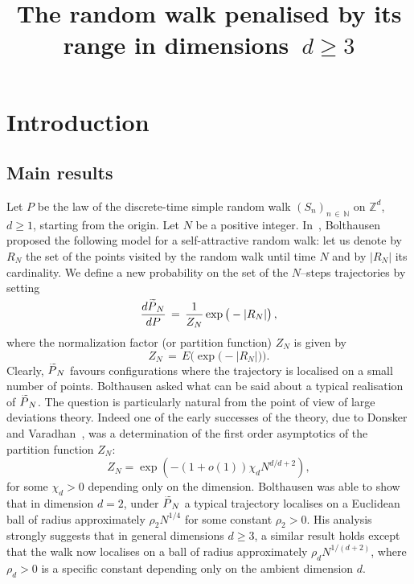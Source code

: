 \documentclass[AHL, Unicode, longabstracts, published]{cedram}
\title[The random walk penalised by its range]{The random walk penalised by its range in dimensions~$d\geq 3$}
\author[\initial{N.} \lastname{Berestycki}]{\firstname{Nathana\"el} \lastname{Berestycki}}
\author[\initial{R.} \lastname{Cerf}]{\firstname{Rapha\"el} \lastname{Cerf}}
\newcommand*\N {{\mathbb N}}
\newcommand*\wP{\smash{\widetilde P}}
\renewcommand{\N}{\mathbb{N}}
\begin{document}
\maketitle


\pagebreak
\tableofcontents
\pagebreak
\section{Introduction}

\subsection{Main results}

Let $P$ be the law of the discrete-time simple random walk $(S_n)_{n\,\in\,\N}$ on $\mathbb{Z}^d$, $d\geq 1$, starting from the origin. Let $N$ be a positive integer. In~\cite{BO}, Bolthausen proposed the following model for a self-attractive random walk: let us denote by $R_N$ the set of the points visited by the random walk until time $N$ and by $|R_N|$ its cardinality. We define a new probability on the set of the $N$--steps trajectories by setting
\begin{equation}\label{defPN}
\frac{d\wP_N}{dP}\,=\,\frac{1}{Z_N}\exp\big(-|R_N|\big)\,,
\end{equation}
where the normalization factor (or partition function) $Z_N$ is given by
\begin{equation}\label{partitionfunction}
Z_N\,=\,E\big(
\exp\big(-|R_N|\big)\big).
\end{equation}
Clearly, $\wP_N$ favours configurations where the trajectory is localised on a small number of points. Bolthausen asked what can be said about a typical realisation of $\wP_N$. The question is particularly natural from the point of view of large deviations theory. Indeed one of the early successes of the theory, due to Donsker and Varadhan~\cite{DV1}, was a determination of the first order asymptotics of the partition function $Z_N$:
\begin{equation}\label{DV}
Z_N = \exp \left(- (1+ o(1)) \chi_d N^{d/{d+2}}
\right),
\end{equation}
for some $\chi_d>0$ depending only on the dimension. Bolthausen was able to show that in dimension $d=2$, under $\wP_N$ a typical trajectory localises on a Euclidean ball of radius approximately $\rho_2 N^{1/4}$ for some constant $\rho_2>0$. His analysis strongly suggests that in general dimensions $d \ge 3$, a similar result holds except that the walk now localises on a ball of radius approximately $\rho_d N^{1/ (d+2)}$, where $\rho_d>0$ is a specific constant depending only on the ambient dimension $d$.
\end{document}
